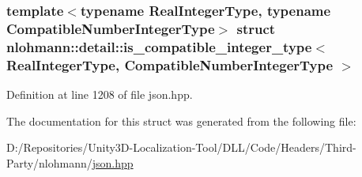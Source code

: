 \subsubsection*{template$<$typename Real\+Integer\+Type, typename Compatible\+Number\+Integer\+Type$>$\newline
struct nlohmann\+::detail\+::is\+\_\+compatible\+\_\+integer\+\_\+type$<$ Real\+Integer\+Type, Compatible\+Number\+Integer\+Type $>$}



Definition at line 1208 of file json.\+hpp.



The documentation for this struct was generated from the following file\+:\begin{DoxyCompactItemize}
\item 
D\+:/\+Repositories/\+Unity3\+D-\/\+Localization-\/\+Tool/\+D\+L\+L/\+Code/\+Headers/\+Third-\/\+Party/nlohmann/\mbox{\hyperlink{json_8hpp}{json.\+hpp}}\end{DoxyCompactItemize}
